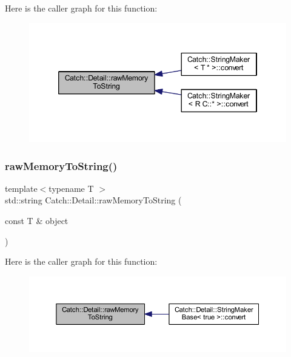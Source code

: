 Here is the caller graph for this function\+:\nopagebreak
\begin{figure}[H]
\begin{center}
\leavevmode
\includegraphics[width=346pt]{namespace_catch_1_1_detail_ac5d6c510e565ee5bddcc2236194ce29e_icgraph}
\end{center}
\end{figure}
\hypertarget{namespace_catch_1_1_detail_a371620ed524abfcae5c3772bf49b563a}{}\label{namespace_catch_1_1_detail_a371620ed524abfcae5c3772bf49b563a} 
\subsubsection{\texorpdfstring{raw\+Memory\+To\+String()}{rawMemoryToString()}\hspace{0.1cm}{\footnotesize\ttfamily [2/2]}}
{\footnotesize\ttfamily template$<$typename T $>$ \\
std\+::string Catch\+::\+Detail\+::raw\+Memory\+To\+String (\begin{DoxyParamCaption}\item[{const T \&}]{object }\end{DoxyParamCaption})\hspace{0.3cm}{\ttfamily [inline]}}

Here is the caller graph for this function\+:\nopagebreak
\begin{figure}[H]
\begin{center}
\leavevmode
\includegraphics[width=350pt]{namespace_catch_1_1_detail_a371620ed524abfcae5c3772bf49b563a_icgraph}
\end{center}
\end{figure}
\hypertarget{namespace_catch_1_1_detail_aff0ca0f561ad8053654ab27d54486197}{}\label{namespace_catch_1_1_detail_aff0ca0f561ad8053654ab27d54486197} 
